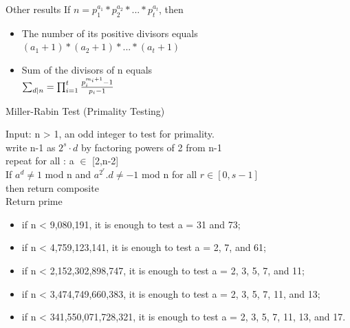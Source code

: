 \documentclass{beamer}
\begin{document}
\begin{frame}[<+->]{Other results}
    If $n = p_1^{a_1}*p_2^{a_2}*...*p_t^{a_t}$, then\\
      \begin{itemize}
      \item The number of its positive divisors equals $(a_1 + 1) * (a_2 + 1) * ... * (a_t + 1)$
      \item Sum of the divisors of n equals\\
      $\sum_{d|n} = \prod_{i=1}^t {p_i^{m_i + 1} - 1 \over p_i - 1}$
      \end{itemize}
\end{frame}
\begin{frame}[<+->]{Miller-Rabin Test (Primality Testing)}
  \begin{block}{}
    Input: n > 1, an odd integer to test for primality.\\
    write n-1 as $2^s·d$ by factoring powers of 2 from n-1\\
    repeat for all : a $\in$ [2,n-2]\\
      \hspace{3mm} If $a^d \neq 1$ mod n and $a^{2^r}.d \neq -1$ mod n for all $r \in [0, s − 1]$\\
      \hspace{3mm} then return composite\\
    Return prime
\end{block}
\begin{block}{}
\begin{itemize}
  \item \small{if n < 9,080,191, it is enough to test a = 31 and 73;}
  \item \small{if n < 4,759,123,141, it is enough to test a = 2, 7, and 61;}
  \item \small{if n < 2,152,302,898,747, it is enough to test a = 2, 3, 5, 7, and 11;}
  \item \small{if n < 3,474,749,660,383, it is enough to test a = 2, 3, 5, 7, 11, and 13;}
  \item \small{if n < 341,550,071,728,321, it is enough to test a = 2, 3, 5, 7, 11, 13, and 17.}
\end{itemize}
\end{block}
\end{frame}
\end{document}
